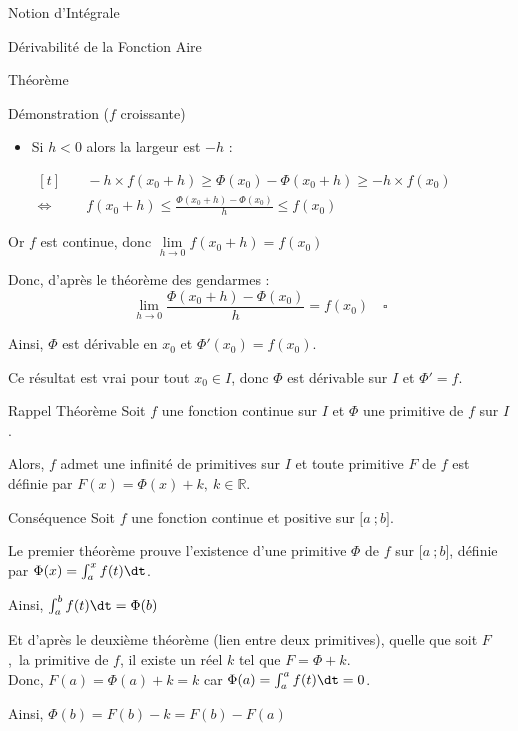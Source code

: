 \documentclass{cours}
\begin{document}
\begin{Gpartie}{Notion d'Intégrale}
\begin{Spartie}{Dérivabilité de la Fonction Aire}
\begin{SSpartie}{Théorème}
\begin{SSSpartie}{Démonstration \big($f$ croissante\big)}
\begin{itemize}
                        \item Si $h<0$ alors la largeur est $-h$ :
                        
                        $\begin{aligned}[t]
                            &\quad -h\times f(x_0+h)\geq\Phi(x_0)-\Phi(x_0+h)\geq -h\times f(x_0) \\
                            \iff&\quad f(x_0+h)\leq\frac{\Phi\left(x_0+h\right)-\Phi(x_0)}{h}\leq f(x_0)
                        \end{aligned}$
                    \end{itemize}
                    Or $f$ est continue, donc $\lim\limits_{h\to0}f(x_0+h)=f(x_0)$

                    Donc, d'après le théorème des gendarmes : \[\lim\limits_{h\to0}\frac{\Phi\left(x_0+h\right)-\Phi(x_0)}{h}=f(x_0)\quad\square\]

                    Ainsi, $\Phi$ est dérivable en $x_0$ et $\Phi'(x_0)=f(x_0)$.

                    Ce résultat est vrai pour tout $x_0\in I$, donc $\Phi$ est dérivable sur $I$ et $\Phi'=f$.
                \end{SSSpartie}
            \end{SSpartie}
            \begin{SSpartie}{Rappel Théorème} 
                Soit $f$ une fonction continue sur $I$ et $\Phi$ une primitive de $f$ sur $I$.

                Alors, $f$ admet une infinité de primitives sur $I$ et toute primitive $F$ de $f$ est définie par $F(x)=\Phi(x)+k,~k\in\mathbb{R}$.
            \end{SSpartie}
            \begin{SSpartie}{Conséquence} 
                Soit $f$ une fonction continue et positive sur $\big[a~;b\big]$.

                Le premier théorème prouve l'existence d'une primitive $\Phi$ de $f$ sur $\big[a~;b\big]$, définie par $\Phi(x)=\int_a^xf(t)\dt$.

                Ainsi, $\int_a^b f(t)\dt=\Phi(b)$

                Et d'après le deuxième théorème (lien entre deux primitives), quelle que soit $F$,~la primitive de $f$, il existe un réel $k$ tel que $F=\Phi+k$. \\ Donc, $F(a)=\Phi(a)+k=k$ car $\Phi(a)=\int_a^af(t)\dt=0$.

                Ainsi, $\Phi(b)=F(b)-k=F(b)-F(a)$


\end{SSpartie}
\end{Spartie}
\end{Gpartie}
\end{document}
